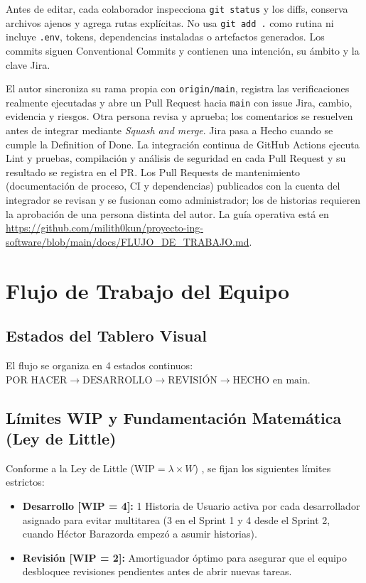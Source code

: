 \documentclass[11pt,a4paper]{article}
\begin{document}
Antes de editar, cada colaborador inspecciona \texttt{git status} y los diffs, conserva archivos ajenos y agrega rutas explícitas. No usa \texttt{git add .} como rutina ni incluye \texttt{.env}, tokens, dependencias instaladas o artefactos generados. Los commits siguen Conventional Commits y contienen una intención, su ámbito y la clave Jira.

El autor sincroniza su rama propia con \texttt{origin/main}, registra las verificaciones realmente ejecutadas y abre un Pull Request hacia \texttt{main} con issue Jira, cambio, evidencia y riesgos. Otra persona revisa y aprueba; los comentarios se resuelven antes de integrar mediante \textit{Squash and merge}. Jira pasa a Hecho cuando se cumple la Definition of Done. La integración continua de GitHub Actions ejecuta Lint y pruebas, compilación y análisis de seguridad en cada Pull Request y su resultado se registra en el PR. Los Pull Requests de mantenimiento (documentación de proceso, CI y dependencias) publicados con la cuenta del integrador se revisan y se fusionan como administrador; los de historias requieren la aprobación de una persona distinta del autor. La guía operativa está en \url{https://github.com/milith0kun/proyecto-ing-software/blob/main/docs/FLUJO_DE_TRABAJO.md}.

\section{Flujo de Trabajo del Equipo}
\subsection{Estados del Tablero Visual}
El flujo se organiza en 4 estados continuos: $\text{POR HACER} \longrightarrow \text{DESARROLLO} \longrightarrow \text{REVISIÓN} \longrightarrow \text{HECHO en main}$.

\subsection{Límites WIP y Fundamentación Matemática (Ley de Little)}
Conforme a la Ley de Little ($\text{WIP} = \lambda \times W$) \cite{little1961}, se fijan los siguientes límites estrictos:
\begin{itemize}[leftmargin=*]
    \item \textbf{Desarrollo [WIP = 4]:} 1 Historia de Usuario activa por cada desarrollador asignado para evitar multitarea (3 en el Sprint 1 y 4 desde el Sprint 2, cuando Héctor Barazorda empezó a asumir historias).
    \item \textbf{Revisión [WIP = 2]:} Amortiguador óptimo para asegurar que el equipo desbloquee revisiones pendientes antes de abrir nuevas tareas.
\end{itemize}
\end{document}
